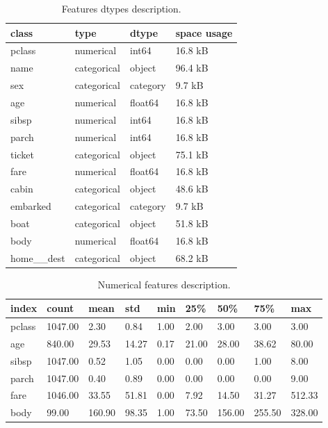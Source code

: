 \documentclass{article}%
\begin{document}
\begin{table}[H]%
\begin{center}%
\begin{tabular}{l l l l}%
\hline%
\textbf{class}&\textbf{type}&\textbf{dtype}&\textbf{space usage}\\%
\hline%
pclass&numerical&int64&16.8 kB\\%
name&categorical&object&96.4 kB\\%
sex&categorical&category&9.7 kB\\%
age&numerical&float64&16.8 kB\\%
sibsp&numerical&int64&16.8 kB\\%
parch&numerical&int64&16.8 kB\\%
ticket&categorical&object&75.1 kB\\%
fare&numerical&float64&16.8 kB\\%
cabin&categorical&object&48.6 kB\\%
embarked&categorical&category&9.7 kB\\%
boat&categorical&object&51.8 kB\\%
body&numerical&float64&16.8 kB\\%
home\_\_dest&categorical&object&68.2 kB\\%
\hline%
\end{tabular}%
\end{center}%
\caption{Features dtypes description.}%
\end{table}

%


\begin{table}[H]%
\begin{center}%
\begin{tabular}{l l l l l l l l l}%
\hline%
\textbf{index}&\textbf{count}&\textbf{mean}&\textbf{std}&\textbf{min}&\textbf{25\%}&\textbf{50\%}&\textbf{75\%}&\textbf{max}\\%
\hline%
pclass&1047.00&2.30&0.84&1.00&2.00&3.00&3.00&3.00\\%
age&840.00&29.53&14.27&0.17&21.00&28.00&38.62&80.00\\%
sibsp&1047.00&0.52&1.05&0.00&0.00&0.00&1.00&8.00\\%
parch&1047.00&0.40&0.89&0.00&0.00&0.00&0.00&9.00\\%
fare&1046.00&33.55&51.81&0.00&7.92&14.50&31.27&512.33\\%
body&99.00&160.90&98.35&1.00&73.50&156.00&255.50&328.00\\%
\hline%
\end{tabular}%
\end{center}%
\caption{Numerical features description.}%
\end{table}
\end{document}
